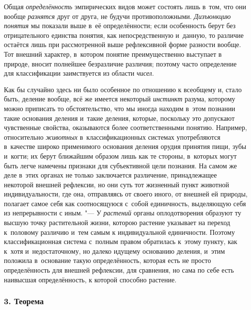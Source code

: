 Общая {\em определённость}
эмпирических видов может состоять лишь в~том, что они вообще
{\em разнятся} друг от
друга, не будучи противоположными.
{\em Дизъюнкцию понятия}
мы показали выше в~её определённости; если особенность берут
без отрицательного единства понятия, как непосредственную и~данную, то
различие остаётся лишь при рассмотренной выше рефлексивной форме разности
вообще. Тот внешний характер, в~котором понятие преимущественно выступает в
природе, вносит полнейшее безразличие различия; поэтому часто определение
для классификации заимствуется из области
{\em чисел}.

Как бы случайно здесь ни было особенное по отношению к
всеобщему и, стало быть, деление вообще, всё же имеется некоторый
{\em инстинкт} разума,
которому можно приписать то обстоятельство, что мы иногда находим в~этом
познании такие основания деления и~такие деления, которые, поскольку это
допускают чувственные свойства, оказываются более соответственными понятию.
Например, относительно {\em животных}
в~классификационных системах употребляются в~качестве широко
применимого основания деления орудия принятия пищи, зубы и~когти; их берут
ближайшим образом лишь как те стороны, в~которых могут быть легче намечены
признаки для субъективной цели познания. На самом же деле в~этих органах не
только заключается различение, принадлежащее некоторой внешней рефлексии,
но они суть тот жизненный пункт животной индивидуальности, где она,
отправляясь от своего иного, от внешней ей природы, полагает самое себя
как соотносящуюся с~собой единичность, выделяющую себя из непрерывности с
иным. "--- У {\em растений} органы
оплодотворения образуют ту высшую точку растительной жизни, которою
растение указывает на переход к~половому различию и~тем самым к
индивидуальной единичности. Поэтому классификационная система с~полным
правом обратилась к~этому пункту, как к~хотя и~недостаточному, но далеко
идущему основанию деления, и~этим положила в~основание такую
определённость, которая есть не просто определённость для внешней
рефлексии, для сравнения, но сама по себе есть наивысшая определённость, к
которой способно растение.

\subsubsection[3. Теорема]{\bfseries 3. Теорема}

